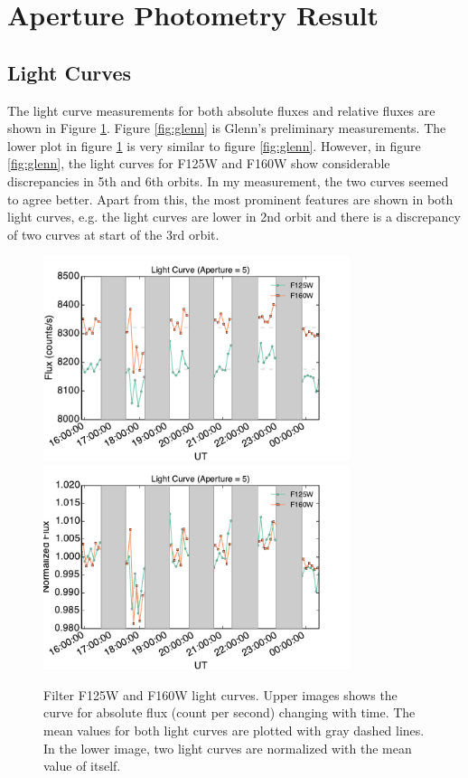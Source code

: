 \documentclass[paper=letter, fontsize=11pt]{scrartcl} %
\numberwithin{equation}{section} %
\numberwithin{figure}{section} %
\numberwithin{table}{section} %
\begin{document}
\section{Aperture Photometry Result}
\subsection{Light Curves}

The light curve measurements for both absolute fluxes and relative
fluxes are shown in Figure \ref{fig:lightcurve}. Figure
\ref{fig:glenn} is Glenn's preliminary measurements. The lower plot in
figure \ref{fig:lightcurve} is very similar to figure
\ref{fig:glenn}. However, in figure \ref{fig:glenn}, the light curves
for F125W and F160W show considerable discrepancies in 5th and 6th
orbits. In my measurement, the two curves seemed to agree better. Apart
from this, the most prominent features are shown in both light
curves, e.g. the light curves are lower in 2nd orbit and there is a 
discrepancy of two curves at start of the 3rd orbit.

\begin{figure}
  \centering
  \includegraphics[width=0.8\textwidth]{fluxcurve_aper_05}
  \includegraphics[width=0.8\textwidth]{relativefluxcurve_aper_05}
  \caption{Filter F125W and F160W light curves. Upper images shows the
    curve for absolute flux (count per second) changing with time. The
    mean values for both light curves are plotted with gray dashed
    lines. In the lower image, two light curves are normalized with
    the mean value of itself.}
  \label{fig:lightcurve}
\end{figure}
\end{document}
